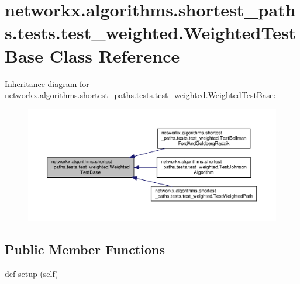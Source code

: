\hypertarget{classnetworkx_1_1algorithms_1_1shortest__paths_1_1tests_1_1test__weighted_1_1WeightedTestBase}{}\section{networkx.\+algorithms.\+shortest\+\_\+paths.\+tests.\+test\+\_\+weighted.\+Weighted\+Test\+Base Class Reference}
\label{classnetworkx_1_1algorithms_1_1shortest__paths_1_1tests_1_1test__weighted_1_1WeightedTestBase}


Inheritance diagram for networkx.\+algorithms.\+shortest\+\_\+paths.\+tests.\+test\+\_\+weighted.\+Weighted\+Test\+Base\+:
\nopagebreak
\begin{figure}[H]
\begin{center}
\leavevmode
\includegraphics[width=350pt]{classnetworkx_1_1algorithms_1_1shortest__paths_1_1tests_1_1test__weighted_1_1WeightedTestBase__inherit__graph}
\end{center}
\end{figure}
\subsection*{Public Member Functions}
\begin{DoxyCompactItemize}
\item 
def \hyperlink{classnetworkx_1_1algorithms_1_1shortest__paths_1_1tests_1_1test__weighted_1_1WeightedTestBase_a4a4136a9548bc743a9a4d7662766c913}{setup} (self)
\end{DoxyCompactItemize}
